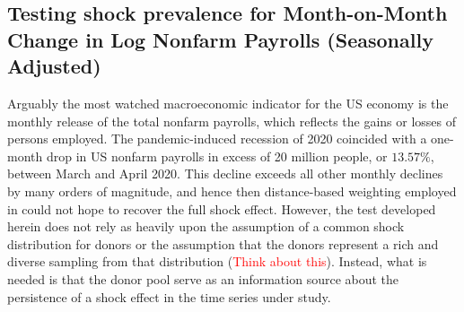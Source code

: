 \documentclass[11pt]{article}
\def\mbf#1{\mathbf{#1}} %
\theoremstyle{definition}
\begin{document}


\subsection{Testing shock prevalence for Month-on-Month Change in Log Nonfarm Payrolls (Seasonally Adjusted)}

\label{sptuem}

Arguably the most watched macroeconomic indicator for the US economy is the monthly release of the total nonfarm payrolls, which reflects the gains or losses of persons employed. The pandemic-induced recession of 2020 coincided with a one-month drop in US nonfarm payrolls in excess of 20 million people, or $13.57\%$, between March and April 2020.  This decline exceeds all other monthly declines by many orders of magnitude, and hence then distance-based weighting employed in \citep{lin2021minimizing} could not hope to recover the full shock effect.  However, the test developed herein does not rely as heavily upon the assumption of a common shock distribution for donors or the assumption that the donors represent a rich and diverse sampling from that distribution (\textcolor{red}{Think about this}).  Instead, what is needed is that the donor pool serve as an information source about the persistence of a shock effect in the time series under study.  
\end{document}
